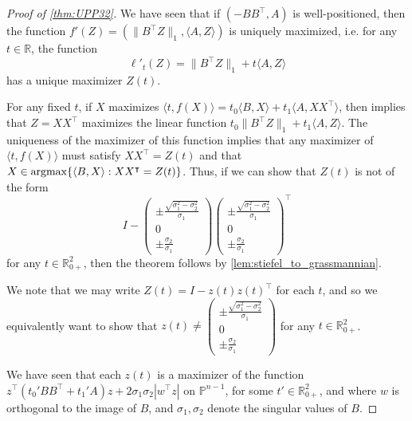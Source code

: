 \documentclass{article}
\numberwithin{equation}{section}
\newcommand{\R}{\mathbb{R}}
\newcommand{\PP}{\mathbb{P}}
\newcommand{\argmax}{\operatornamewithlimits{argmax}}
\begin{document}
\begin{proof}[Proof of \cref{thm:UPP32}]
    We have seen that if $(-BB^{\intercal},A)$ is well-positioned, then the function $f'(Z) = (\|B^{\intercal} Z\|_1, \langle A, Z\rangle)$ is uniquely maximized, i.e. for any $t \in \R$, the function
    \[
        \ell'_t(Z) = \|B^{\intercal} Z\|_1+t\langle A, Z\rangle
    \]
    has a unique maximizer $Z(t)$. 

    For any fixed $t$, if $X$ maximizes $\langle t, f(X)\rangle = t_0\langle B, X\rangle + t_1\langle A, XX^{\intercal}\rangle$, then  implies that $Z = XX^{\intercal}$ maximizes the linear function $t_0\|B^{\intercal}Z\|_1 + t_1\langle A, Z\rangle$. The uniqueness of the maximizer of this function implies that any maximizer of $\langle t, f(X)\rangle$ must satisfy $XX^{\intercal} = Z(t)$ and that 
    $X \in \argmax \{\langle B, X\rangle : XX^{\intercal} = Z(t)\}$. Thus, if we can show that $Z(t)$ is not of the form 
    \[
        I -
        \begin{pmatrix}
        \pm \frac{\sqrt{\sigma_1^2 - \sigma_2^2}}{\sigma_1}\\ 0\\\pm \frac{\sigma_2}{\sigma_1}
        \end{pmatrix}
        \begin{pmatrix}
        \pm \frac{\sqrt{\sigma_1^2 - \sigma_2^2}}{\sigma_1}\\ 0\\\pm \frac{\sigma_2}{\sigma_1}
        \end{pmatrix}^{\intercal}
    \]
    for any $t \in \R^2_{0+}$, then the theorem follows by \cref{lem:stiefel_to_grassmannian}.

    We note that we may write $Z(t) = I-z(t)z(t)^{\intercal}$ for each $t$, and so we equivalently want to show that $z(t) \neq \begin{pmatrix} \pm \frac{\sqrt{\sigma_1^2 - \sigma_2^2}}{\sigma_1}\\ 0\\\pm \frac{\sigma_2}{\sigma_1} \end{pmatrix}$ for any $t \in \R^2_{0+}$.
    
    We have seen that each $z(t)$ is a maximizer of the function $z^{\intercal}(t_0'BB^{\intercal} + t_1' A)z + 2\sigma_1\sigma_2|w^{\intercal}z|$ on $\PP^{n-1}$, for some $t' \in \R^2_{0+}$, and where $w$ is orthogonal to the image of $B$, and $\sigma_1, \sigma_2$ denote the singular values of $B$.


\end{proof}
\end{document}
